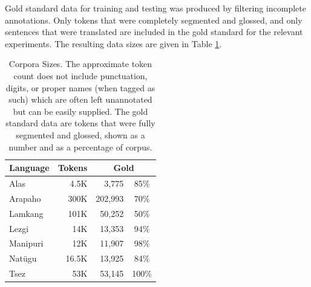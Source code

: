 Gold standard data for training and testing was produced by filtering incomplete annotations. Only tokens that were completely segmented and glossed, and only sentences that were translated are included in the gold standard for the relevant experiments. The resulting data sizes are given in Table \ref{tab:goldstandard}.

\begin{table}[h!]
    \centering
    \begin{tabular}{l|r|r|c}
         \textbf{Language} & \textbf{Tokens} & \multicolumn{2}{c}{\textbf{Gold}} \\
         \hline
         Alas & 4.5K & 3,775 & 85\%  \\
         \hline
         Arapaho & 300K & 202,993 & 70\% \\
         \hline
         Lamkang & 101K & 50,252 & 50\% \\
         \hline
         Lezgi & 14K & 13,353  &  94\% \\
         \hline
         Manipuri & 12K & 11,907 & 98\% \\
         \hline
         Natügu & 16.5K & 13,925 &  84\%  \\
         \hline
         Tsez & 53K & 53,145 & 100\%  \\
    \end{tabular}
    \caption[Corpora Sizes]{Corpora Sizes. The approximate token count does not include punctuation, digits, or proper names (when tagged as such) which are often left unannotated but can be easily supplied. The gold standard data are tokens that were fully segmented and glossed, shown as a number and as a percentage of corpus.}
    \label{tab:goldstandard}
\end{table}


